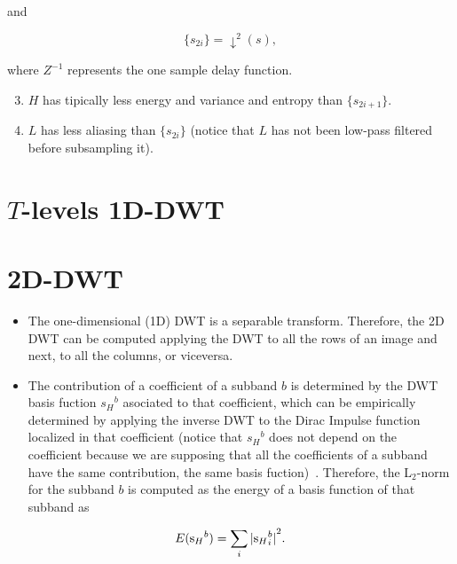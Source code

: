 and

\begin{equation*}
   \{s_{2i}\} = \downarrow^2(s),
\end{equation*}

where \(Z^{-1}\) represents the one sample delay function.

\begin{enumerate}
\setcounter{enumi}{2}
\tightlist
\item
  \(H\) has tipically less energy and variance and entropy than
  \(\{s_{2i+1}\}\).
\item
  \(L\) has less aliasing than \(\{s_{2i}\}\) (notice that \(L\) has not
  been low-pass filtered before subsampling it).
\end{enumerate}

\section{$T$-levels 1D-DWT}

\section{2D-DWT}    
\begin{itemize}
\tightlist
\item
  The one-dimensional (1D) DWT is a separable transform. Therefore, the
  2D DWT can be computed applying the DWT to all the rows of an image
  and next, to all the columns, or viceversa.
\end{itemize}


\begin{itemize}
\tightlist
\item
  The contribution of a coefficient of a subband \(b\) is determined
  by the DWT basis fuction \({s_H}^b\) asociated to that coefficient,
  which can be empirically determined by applying the inverse DWT to
  the Dirac Impulse function localized in that coefficient (notice
  that \({s_H}^b\) does not depend on the coefficient because we are
  supposing that all the coefficients of a subband have the same
  contribution, the same basis
  fuction)~\cite{rabbani2009jpeg}. Therefore, the L\(_2\)-norm for the
  subband \(b\) is computed as the energy of a basis function of that
  subband as
\end{itemize}

\begin{equation}
  E({{\text s}_H}^b) = \sum_i{|{{\text s}_H}^b_i|}^2.
\end{equation}

